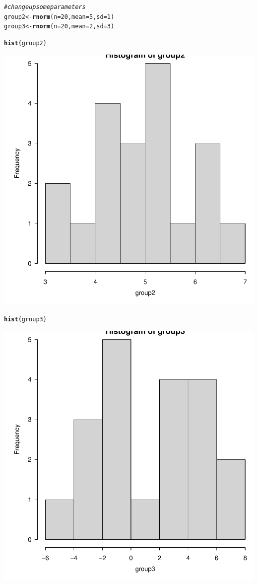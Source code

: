 \documentclass{article}\usepackage[]{graphicx}\usepackage[]{color}
\makeatletter
\newcommand{\hlnum}[1]{\textcolor[rgb]{0.686,0.059,0.569}{#1}}%
\newcommand{\hlcom}[1]{\textcolor[rgb]{0.678,0.584,0.686}{\textit{#1}}}%
\newcommand{\hlstd}[1]{\textcolor[rgb]{0.345,0.345,0.345}{#1}}%
\newcommand{\hlkwb}[1]{\textcolor[rgb]{0.69,0.353,0.396}{#1}}%
\newcommand{\hlkwc}[1]{\textcolor[rgb]{0.333,0.667,0.333}{#1}}%
\newcommand{\hlkwd}[1]{\textcolor[rgb]{0.737,0.353,0.396}{\textbf{#1}}}%
\newenvironment{kframe}{%
 \def\at@end@of@kframe{}%
 \ifinner\ifhmode%
  \def\at@end@of@kframe{\end{minipage}}%
  \begin{minipage}{\columnwidth}%
 \fi\fi%
 \def\FrameCommand##1{\hskip\@totalleftmargin \hskip-\fboxsep
 \colorbox{shadecolor}{##1}\hskip-\fboxsep
     \hskip-\linewidth \hskip-\@totalleftmargin \hskip\columnwidth}%
 \MakeFramed {\advance\hsize-\width
   \@totalleftmargin\z@ \linewidth\hsize
   \@setminipage}}%
 {\par\unskip\endMakeFramed%
 \at@end@of@kframe}
\newenvironment{knitrout}{}{} %
\makeatother
\begin{document}
\begin{knitrout}
{}


\begin{kframe}\begin{alltt}
\hlcom{# change up some parameters}
\hlstd{group2} \hlkwb{<-} \hlkwd{rnorm}\hlstd{(}\hlkwc{n} \hlstd{=} \hlnum{20}\hlstd{,} \hlkwc{mean} \hlstd{=} \hlnum{5}\hlstd{,} \hlkwc{sd} \hlstd{=} \hlnum{1}\hlstd{)}
\hlstd{group3} \hlkwb{<-} \hlkwd{rnorm}\hlstd{(}\hlkwc{n} \hlstd{=} \hlnum{20}\hlstd{,} \hlkwc{mean} \hlstd{=} \hlnum{2}\hlstd{,} \hlkwc{sd} \hlstd{=} \hlnum{3}\hlstd{)}

\hlkwd{hist}\hlstd{(group2)}
\end{alltt}
\end{kframe}

{\centering \includegraphics[width=.6\linewidth]{figure/Tutorial08-datasims-S2022-Rnwauto-report-2} 

}


\begin{kframe}\begin{alltt}
\hlkwd{hist}\hlstd{(group3)}
\end{alltt}
\end{kframe}

{\centering \includegraphics[width=.6\linewidth]{figure/Tutorial08-datasims-S2022-Rnwauto-report-3} 

}
\end{knitrout}
\end{document}
